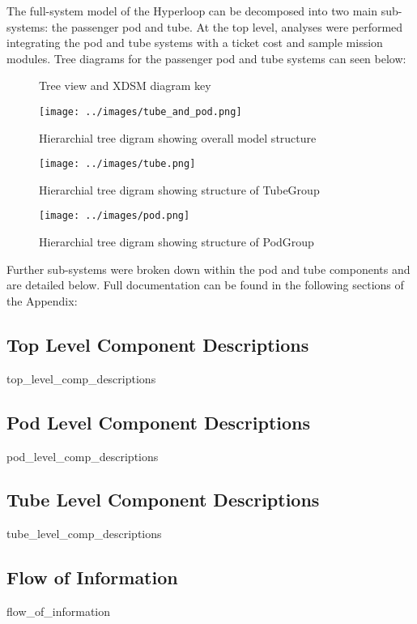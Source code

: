 The full-system model of the Hyperloop can be decomposed into two main sub-systems: the passenger pod and tube. At the top level, analyses were performed integrating the pod and tube systems with a ticket cost  and sample mission modules. Tree diagrams for the passenger pod and tube systems can seen below:


\usetikzlibrary{arrows,chains,positioning,scopes,shapes.geometric,shapes.misc,shadows}
\begin{figure}
	\centering
	\caption{Tree view and XDSM diagram key}
	\label{fig:key}
\end{figure}

\begin{figure}
	\centering
	\texttt{[image: ../images/tube\_and\_pod.png]}
	\caption{Hierarchial tree digram showing overall model structure}
	\label{fig:tree:tube_and_pod}
\end{figure}

\begin{figure}
	\centering
	\texttt{[image: ../images/tube.png]}
	\caption{Hierarchial tree digram showing structure of TubeGroup}
	\label{fig:tree:tube}
\end{figure}

\begin{figure}
	\centering
	\texttt{[image: ../images/pod.png]}
	\caption{Hierarchial tree digram showing structure of PodGroup}
	\label{fig:tube}
\end{figure}

Further sub-systems were broken down within the pod and tube components and are detailed below. Full documentation can be found in the following sections of the Appendix: 

\subsection{Top Level Component Descriptions}
	{top_level_comp_descriptions}
\subsection{Pod Level Component Descriptions}
	{pod_level_comp_descriptions}
\subsection{Tube Level Component Descriptions}
	{tube_level_comp_descriptions}
\subsection{Flow of Information}
	{flow_of_information}


